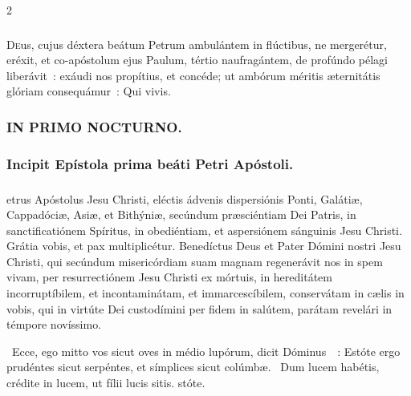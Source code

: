 \documentclass[9pt,twoside]{extarticle}
\begin{document}
\begin{multicols}{2}
{{\subsubsection*{\center {}}
\lettrine{D}eus, cujus déxtera beátum Petrum ambulántem in flúctibus, ne mergerétur, eréxit, et co-apóstolum ejus Paulum, tértio naufragántem, de profúndo pélagi liberávit~: exáudi nos propítius, et concéde; ut ambórum méritis æternitátis glóriam consequámur~: Qui vivis.

\subsubsection*{\center \textsc{IN PRIMO NOCTURNO.}}
\begin{tightlist}{}
\item {}
\item {}
\end{tightlist}

\subsubsection*{\center Incipit Epístola prima beáti Petri Apóstoli.}
\subsubsection*{\center {}}
etrus Apóstolus Jesu Christi, eléctis ádvenis dispersiónis Ponti, Galátiæ, Cappadóciæ, Asiæ, et Bithýniæ,
secúndum præsciéntiam Dei Patris, in sanctificatiónem Spíritus, in obediéntiam, et aspersiónem sánguinis Jesu Christi. Grátia vobis, et pax multiplicétur.
Benedíctus Deus et Pater Dómini nostri Jesu Christi, qui secúndum misericórdiam suam magnam regenerávit nos in spem vivam, per resurrectiónem Jesu Christi ex mórtuis,
in hereditátem incorruptíbilem, et incontaminátam, et immarcescíbilem, conservátam in cælis in vobis,
qui in virtúte Dei custodímini per fidem in salútem, parátam revelári in témpore novíssimo.

\begin{tightlist}{}
\item {}~Ecce, ego mitto vos sicut oves in médio lupórum, dicit Dóminus~~: \textred{*} Estóte ergo prudéntes sicut serpéntes, et símplices sicut colúmbæ. ~Dum lucem habétis, crédite in lucem, ut fílii lucis sitis. stóte.
\end{tightlist}

}}
\end{multicols}
\end{document}
